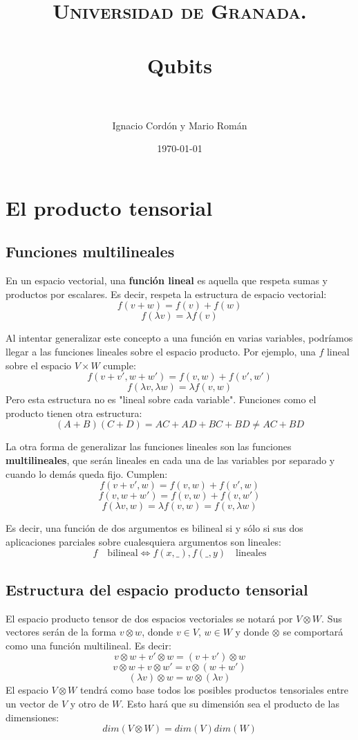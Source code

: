 \documentclass[paper=a4, fontsize=11pt, spanish]{scrartcl}
\title{
  \normalfont \normalsize 
  \textsc{Universidad de Granada.} \\ [25pt] %
  \horrule{0.5pt} \\[0.4cm] %
  \huge Qubits \\ %
  \horrule{2pt} \\[0.5cm] %
}
\author{Ignacio Cordón y Mario Román} %
\date{\normalsize\today} %
\numberwithin{equation}{section} %
\numberwithin{figure}{section} %
\numberwithin{table}{section} %
\begin{document}
\maketitle %

\section {El producto tensorial}
  \subsection {Funciones multilineales}
    En un espacio vectorial, una \textbf{función lineal} es aquella que respeta sumas y productos por escalares.
    Es decir, respeta la estructura de espacio vectorial:
    $$ f(v+w) = f(v) + f(w) $$
    $$ f(\lambda v) = \lambda f(v) $$

    Al intentar generalizar este concepto a una función en varias variables, podríamos llegar a las funciones 
    lineales sobre el espacio producto. Por ejemplo, una $f$ lineal sobre el espacio $V \times W$ cumple:
    $$ f(v+v',w+w') = f(v,w) + f(v',w')$$
    $$ f(\lambda v, \lambda w) = \lambda f(v,w) $$
    Pero esta estructura no es "lineal sobre cada variable". Funciones como el producto tienen otra
    estructura:
    $$ (A+B)(C+D) = AC+AD+BC+BD \neq AC+BD $$
    
    La otra forma de generalizar las funciones lineales son las funciones \textbf{multilineales}, que serán lineales
    en cada una de las variables por separado y cuando lo demás queda fijo. Cumplen:
    $$ f(v+v',w) = f(v,w) + f(v',w) $$
    $$ f(v,w+w') = f(v,w) + f(v,w') $$
    $$ f(\lambda v,w) = \lambda f(v,w) = f(v,\lambda w) $$

    Es decir, una función de dos argumentos es bilineal si y sólo si sus dos aplicaciones parciales sobre
    cualesquiera argumentos son lineales:
    $$ f\quad \mbox{bilineal} \Leftrightarrow f(x,\_), f(\_,y)\quad \mbox{lineales} $$
    
  \subsection{Estructura del espacio producto tensorial}
    El espacio producto tensor de dos espacios vectoriales se notará por $V \otimes W$. Sus vectores serán de
    la forma $v \otimes w$, donde $v \in V$, $w \in W$ y donde $\otimes$ se comportará como una función multilineal.
    Es decir:
    $$ v \otimes w + v' \otimes w  = (v+v') \otimes w $$
    $$ v \otimes w + v \otimes w'  = v \otimes (w+w') $$
    $$ (\lambda v) \otimes w = w \otimes (\lambda v)  $$
    El espacio $V \otimes W$ tendrá como base todos los posibles productos tensoriales entre un vector de $V$ y otro
    de $W$. Esto hará que su dimensión sea el producto de las dimensiones:
    $$ dim(V \otimes W) = dim(V)dim(W) $$
    
\end{document}

